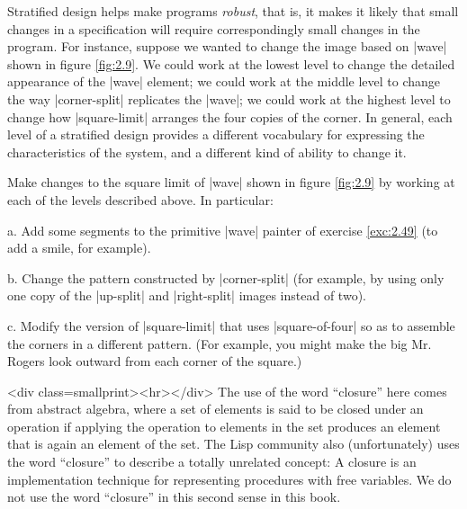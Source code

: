 \begin{Exercise}
\begin{Exercise}
\begin{Exercise}
\begin{Exercise}
\begin{Exercise}
\begin{Exercise}
\begin{Exercise}
\begin{Exercise}
\begin{Exercise}
\begin{Exercise}
\begin{Exercise}
Stratified design helps make programs \textit{robust}, that is, it makes
it likely that small changes in a specification will require
correspondingly small changes in the program.  For instance, suppose
we wanted to change the image based on \scheme|wave| shown in
figure \ref{fig:2.9}.  We could work at the lowest level
to change the detailed appearance of the \scheme|wave| element; we could
work at the middle level to change the way \scheme|corner-split|
replicates the \scheme|wave|; we could work at the highest level to
change how \scheme|square-limit| arranges the four copies of the corner.
In general, each level of a stratified design provides a different
vocabulary for expressing the characteristics of the system, and a
different kind of ability to change it.

\begin{Exercise}
\label{exc:2.52}
Make changes to the square limit of \scheme|wave| shown in
figure \ref{fig:2.9} by working at each of the levels
described above.  In particular:

a.  Add some segments to the primitive \scheme|wave| painter
of exercise  \ref{exc:2.49} (to add a smile, for example).

b.  Change the pattern constructed by \scheme|corner-split|
(for example, by using only one copy of the
\scheme|up-split| and \scheme|right-split| images instead of two).

c.  Modify the version of \scheme|square-limit| that uses \scheme|square-of-four|
so as to assemble the corners in a different pattern.  (For example, you
might make the big Mr. Rogers look outward from each corner of the square.)


<div class=smallprint><hr></div>
The use of the word ``closure'' here comes from abstract algebra,
where a set of elements is said to be closed under an operation if
applying the operation to elements in the set produces an element that
is again an element of the set.  The Lisp community
also (unfortunately) uses the word ``closure'' to describe a totally unrelated
concept: A closure is an implementation technique for representing
procedures with free variables.  We do not use the word ``closure'' in
this second sense in this book.


\end{Exercise}
\end{Exercise}
\end{Exercise}
\end{Exercise}
\end{Exercise}
\end{Exercise}
\end{Exercise}
\end{Exercise}
\end{Exercise}
\end{Exercise}
\end{Exercise}
\end{Exercise}
